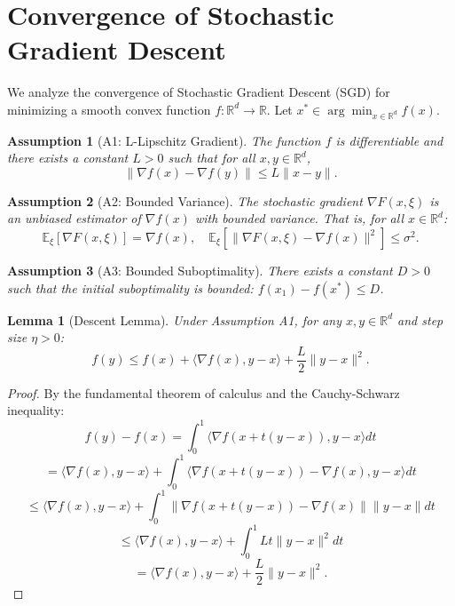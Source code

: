 \documentclass[11pt]{article}
\newtheorem{lemma}[theorem]{Lemma}
\newtheorem{assumption}{Assumption}
\begin{document}
\section{Convergence of Stochastic Gradient Descent}

We analyze the convergence of Stochastic Gradient Descent (SGD) for minimizing a smooth convex function $f: \mathbb{R}^d \to \mathbb{R}$. Let $x^* \in \arg\min_{x \in \mathbb{R}^d} f(x)$.

\begin{assumption}[A1: L-Lipschitz Gradient]
The function $f$ is differentiable and there exists a constant $L > 0$ such that for all $x, y \in \mathbb{R}^d$,
\[ \|\nabla f(x) - \nabla f(y)\| \le L \|x - y\|. \]
\end{assumption}

\begin{assumption}[A2: Bounded Variance]
The stochastic gradient $\nabla F(x, \xi)$ is an unbiased estimator of $\nabla f(x)$ with bounded variance. That is, for all $x \in \mathbb{R}^d$:
\[ \mathbb{E}_\xi[\nabla F(x, \xi)] = \nabla f(x), \quad \mathbb{E}_\xi[\|\nabla F(x, \xi) - \nabla f(x)\|^2] \le \sigma^2. \]
\end{assumption}

\begin{assumption}[A3: Bounded Suboptimality]
There exists a constant $D > 0$ such that the initial suboptimality is bounded: $f(x_1) - f(x^*) \le D$.
\end{assumption}

\begin{lemma}[Descent Lemma]
Under Assumption A1, for any $x, y \in \mathbb{R}^d$ and step size $\eta > 0$:
\[ f(y) \le f(x) + \langle \nabla f(x), y - x \rangle + \frac{L}{2} \|y - x\|^2. \]
\end{lemma}

\begin{proof}
By the fundamental theorem of calculus and the Cauchy-Schwarz inequality:
\[ f(y) - f(x) = \int_0^1 \langle \nabla f(x + t(y-x)), y - x \rangle dt \]
\[ = \langle \nabla f(x), y - x \rangle + \int_0^1 \langle \nabla f(x + t(y-x)) - \nabla f(x), y - x \rangle dt \]
\[ \le \langle \nabla f(x), y - x \rangle + \int_0^1 \|\nabla f(x + t(y-x)) - \nabla f(x)\| \|y - x\| dt \]
\[ \le \langle \nabla f(x), y - x \rangle + \int_0^1 L t \|y - x\|^2 dt \]
\[ = \langle \nabla f(x), y - x \rangle + \frac{L}{2} \|y - x\|^2. \]
\end{proof}
\end{document}
